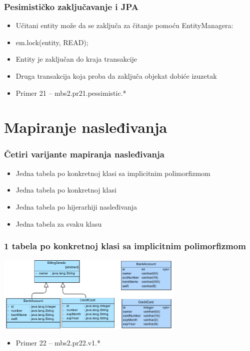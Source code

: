 \documentclass[compress]{beamer}
\begin{document}
\begin{frame}
  \frametitle{Pesimističko zaključavanje i JPA}
  \begin{itemize}
    \item Učitani entity može da se zaključa za čitanje pomoću EntityManagera:
    \item em.lock(entity, READ);
    \item Entity je zaključan do kraja transakcije
    \item Druga transakcija koja proba da zaključa objekat dobiće izuzetak
    \item Primer 21 -- mbs2.pr21.pessimistic.*
  \end{itemize}
\end{frame}

\section[Nasleđivanje]{Mapiranje nasleđivanja}
\begin{frame}
  \frametitle{Četiri varijante mapiranja nasleđivanja}
  \begin{itemize}
    \item Jedna tabela po konkretnoj klasi sa implicitnim polimorfizmom
    \item Jedna tabela po konkretnoj klasi
    \item Jedna tabela po hijerarhiji nasleđivanja
    \item Jedna tabela za svaku klasu
  \end{itemize}
\end{frame}
\begin{frame}
  \frametitle{1 tabela po konkretnoj klasi sa implicitnim polimorfizmom}
  \begin{center}
    \includegraphics[width=9cm]{pic10.pdf}
  \end{center}
  \begin{itemize}
    \item Primer 22 -- mbs2.pr22.v1.*
  \end{itemize}
\end{frame}
\end{document}
